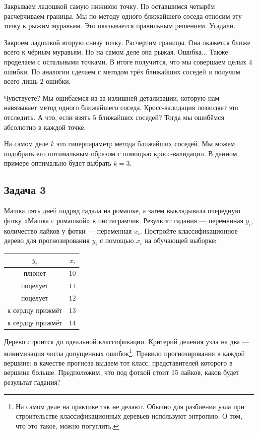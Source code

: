 \documentclass[12pt, a4paper, oneside]{article}
\begin{document}
{\begin{enumerate}
	Закрываем ладошкой самую нижнюю точку. По оставшимся четырём расчерчиваем границы. Мы по методу одного ближайшего соседа относим эту точку к рыжим муравьям. Это оказывается правильным решением. Угадали.
	
	Закроем ладошкой вторую снизу точку. Расчертим границы. Она окажется ближе всего к чёрным муравьям. Но на самом деле она рыжая. Ошибка... Также проделаем с остальными точками. В итоге получится, что мы совершаем целых $4$ ошибки. По аналогии сделаем с методом трёх ближайших соседей и получим всего лишь $2$ ошибки. 
	
	Чувствуете? Мы ошибаемся из-за излишней детализации, которую нам навязывает метод одного ближайшего соседа. Кросс-валидация позволяет это отследить. А что, если взять $5$ ближайших соседей? Тогда мы ошибёмся абсолютно в каждой точке.
	
	На самом деле $k$ это гиперпараметр метода ближайших соседей. Мы можем подобрать его оптимальным образом с помощью кросс-валидации. В данном примере оптимально будет выбрать $k=3$.  
\end{enumerate}
}



\subsection*{Задача 3}

Машка пять дней подряд гадала на ромашке, а затем выкладывала очередную фотку «Машка с ромашкой» в инстаграмчик. Результат гадания — переменная $y_i$, количество лайков у фотки — переменная $x_i$. Постройте классификационное дерево для прогнозирования $y_i$ с помощью $x_i$ на обучающей выборке:

\begin{center}
\begin{tabular}{cc}
	$y_i$ & $x_i$ \\
	\hline
	плюнет & $10$ \\
	поцелует & $11$ \\
	поцелует & $12$ \\
	к сердцу прижмёт & $13$ \\
	к сердцу прижмёт & $14$ \\
\end{tabular}
\end{center}

Дерево строится до идеальной классификации. Критерий деления узла на два — минимизация числа допущенных ошибок\footnote{На самом деле на практике так не делают. Обычно для разбиения узла при строительстве классификационных деревьев используют энтропию. О том, что это такое, можно погуглить.}.  Правило прогнозирования в каждой вершине: в качестве прогноза выдаем тот класс, представителей которого в вершине больше.  Предположим, что под фоткой стоит 15 лайков, каков будет результат гадания? 
\end{document}
